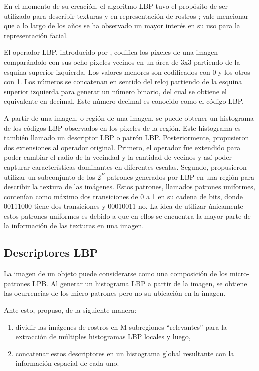 En el momento de su creación, el algoritmo LBP tuvo el propósito de ser utilizado para describir texturas y en representación de rostros \cite{Ahonen2006-gg}; vale mencionar que a lo largo de los años se ha observado un mayor interés en su uso para la representación facial.

El operador LBP, introducido por \cite{Ojala1996-el}, codifica los pixeles de una imagen comparándolo con sus ocho pixeles vecinos en un área de 3x3 partiendo de la esquina superior izquierda. Los valores menores son codificados con 0 y los otros con 1. Los números se concatenan en sentido del reloj partiendo de la esquina superior izquierda para generar un número binario, del cual se obtiene el equivalente en decimal. Este número decimal es conocido como el código LBP. 

A partir de una imagen, o región de una imagen, se puede obtener un histograma de los códigos LBP observados en los pixeles de la región. Este histograma es también llamado un descriptor LBP o patrón LBP.
Posteriormente, \cite{Ojala2002-pl} propusieron dos extensiones al operador original. Primero, el operador fue extendido para poder cambiar el radio de la vecindad y la cantidad de vecinos y así poder capturar características dominantes en diferentes escalas. Segundo, propusieron utilizar un subconjunto de los $2^P$ patrones generados por LBP en una región para describir la textura de las imágenes. Estos patrones, llamados patrones uniformes, contenían como máximo dos transiciones de 0 a 1 en su cadena de bits, donde 00111000 tiene dos transiciones y 00010011 no. La idea de utilizar únicamente estos patrones uniformes es debido a que en ellos se encuentra la mayor parte de la información de las texturas en una imagen. 

\subsection{Descriptores LBP}
La imagen de un objeto puede considerarse como una composición de los micro-patrones LPB. Al generar un histograma LBP a partir de la imagen, se obtiene las ocurrencias de los micro-patrones pero no su ubicación en la imagen. 

Ante esto, \cite{Ahonen2006-gg} propuso, de la siguiente manera:
\begin{enumerate}
    \item dividir las imágenes de rostros en M subregiones “relevantes” para la extracción de múltiples histogramas LBP locales y luego, 
    \item concatenar estos descriptores en un histograma global resultante con la información espacial de cada uno.

\end{enumerate}

